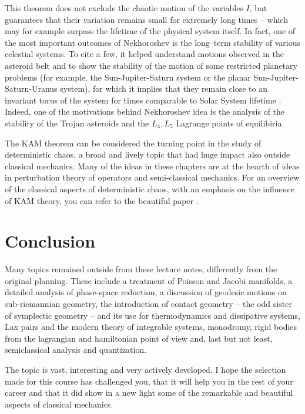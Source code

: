 \documentclass[english,fontsize=11pt,paper=a5,oneside]{scrbook}
\theoremstyle{definition}
\begin{document}
This theorem does not exclude the chaotic motion of the variables $I$, but guarantees that their variation remains small for extremely long times -- which may for example surpass the lifetime of the physical system itself.
In fact, one of the most important outcomes of Nekhoroshev is the long--term stability of various celestial systems. To cite a few, it helped understand motions observed in the asteroid belt and to show the stability of the motion of some restricted planetary problems (for example, the Sun-Jupiter-Saturn system or the planar Sun-Jupiter-Saturn-Uranus system), for which it implies that they remain close to an invariant torus of the system for times comparable to Solar System lifetime \cite{Guzzo2015}.
Indeed, one of the motivations behind Nekhoroshev idea is the analysis of the stability of the Trojan asteroids and the $L_4, L_5$ Lagrange points of equilibiria.

The KAM theorem can be considered the turning point in the study of deterministic chaos, a broad and lively topic that had huge impact also outside classical mechanics.
Many of the ideas in these chapters are at the hearth of ideas in perturbation theory of operators and semi-classical mechanics.
For an overview of the classical aspects of deterministic chaos, with an emphasis on the influence of KAM theory, you can refer to the beautiful paper \cite{zbMATH05911037}.

\chapter{Conclusion}

Many topics remained outside from these lecture notes, differently from the original planning.
These include a treatment of Poisson and Jacobi manifolds, a detailed analysis of phase-space reduction, a discussion of geodesic motions on sub-riemannian geometry, the introduction of contact geometry -- the odd sister of symplectic geometry -- and its use for thermodynamics and dissipative systems, Lax pairs and the modern theory of integrable systems, monodromy, rigid bodies from the lagrangian and hamiltonian point of view and, last but not least, semiclassical analysis and quantization.

The topic is vast, interesting and very actively developed. I hope the selection made for this course has challenged you, that it will help you in the rest of your career and that it did show in a new light some of the remarkable and beautiful aspects of classical mechanics.
\end{document}
